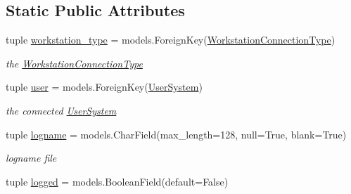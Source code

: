 \subsection*{Static Public Attributes}
\begin{DoxyCompactItemize}
\item 
\hypertarget{classrestriction__system_1_1models_1_1WorkstationUser_a1001c88c0ee3f4bedd99f48976a76865}{}tuple \hyperlink{classrestriction__system_1_1models_1_1WorkstationUser_a1001c88c0ee3f4bedd99f48976a76865}{workstation\+\_\+type} = models.\+Foreign\+Key(\hyperlink{classrestriction__system_1_1models_1_1WorkstationConnectionType}{Workstation\+Connection\+Type})\label{classrestriction__system_1_1models_1_1WorkstationUser_a1001c88c0ee3f4bedd99f48976a76865}

\begin{DoxyCompactList}\small\item\em the \hyperlink{classrestriction__system_1_1models_1_1WorkstationConnectionType}{Workstation\+Connection\+Type} \end{DoxyCompactList}\item 
\hypertarget{classrestriction__system_1_1models_1_1WorkstationUser_a805f3e1595a05df73cbd992958621706}{}tuple \hyperlink{classrestriction__system_1_1models_1_1WorkstationUser_a805f3e1595a05df73cbd992958621706}{user} = models.\+Foreign\+Key(\hyperlink{classrestriction__system_1_1models_1_1UserSystem}{User\+System})\label{classrestriction__system_1_1models_1_1WorkstationUser_a805f3e1595a05df73cbd992958621706}

\begin{DoxyCompactList}\small\item\em the connected \hyperlink{classrestriction__system_1_1models_1_1UserSystem}{User\+System} \end{DoxyCompactList}\item 
\hypertarget{classrestriction__system_1_1models_1_1WorkstationUser_a4e79c5169111cb7580d1a3f655024e40}{}tuple \hyperlink{classrestriction__system_1_1models_1_1WorkstationUser_a4e79c5169111cb7580d1a3f655024e40}{logname} = models.\+Char\+Field(max\+\_\+length=128, null=True, blank=True)\label{classrestriction__system_1_1models_1_1WorkstationUser_a4e79c5169111cb7580d1a3f655024e40}

\begin{DoxyCompactList}\small\item\em logname file \end{DoxyCompactList}\item 
\hypertarget{classrestriction__system_1_1models_1_1WorkstationUser_aad66b3166f276d44a57261954a75486d}{}tuple \hyperlink{classrestriction__system_1_1models_1_1WorkstationUser_aad66b3166f276d44a57261954a75486d}{logged} = models.\+Boolean\+Field(default=False)\label{classrestriction__system_1_1models_1_1WorkstationUser_aad66b3166f276d44a57261954a75486d}


\end{DoxyCompactItemize}
